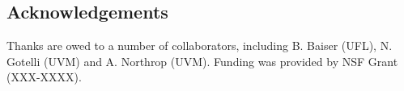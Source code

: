 \documentclass[a0,landscape]{a0poster}
\begin{document}
\begin{multicols}{4}
\color{DarkSlateGray} %





\nocite{*} %


\section*{Acknowledgements}

Thanks are owed to a number of collaborators, including B. Baiser
(UFL), N. Gotelli (UVM) and A. Northrop (UVM). Funding was provided by
NSF Grant (XXX-XXXX). 


\end{multicols}
\end{document}
